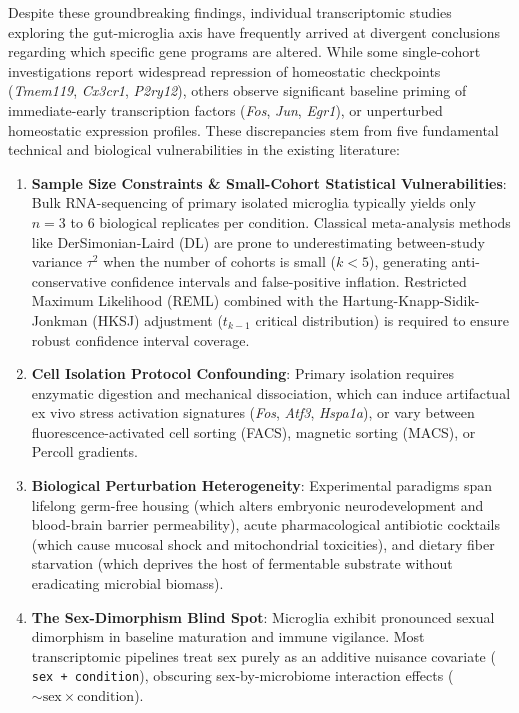 \documentclass[10pt,a4paper]{article}
\begin{document}
Despite these groundbreaking findings, individual transcriptomic studies exploring the gut-microglia axis have frequently arrived at divergent conclusions regarding which specific gene programs are altered\cite{sharon2016_11,abdelhaq2019_12}. While some single-cohort investigations report widespread repression of homeostatic checkpoints (\textit{Tmem119}, \textit{Cx3cr1}, \textit{P2ry12})\cite{thion2018_13}, others observe significant baseline priming of immediate-early transcription factors (\textit{Fos}, \textit{Jun}, \textit{Egr1}), or unperturbed homeostatic expression profiles\cite{spichak2021_14,honda2016_15}. These discrepancies stem from five fundamental technical and biological vulnerabilities in the existing literature:
\begin{enumerate}
\item \textbf{Sample Size Constraints \& Small-Cohort Statistical Vulnerabilities}: Bulk RNA-sequencing of primary isolated microglia typically yields only $n=3$ to $6$ biological replicates per condition. Classical meta-analysis methods like DerSimonian-Laird (DL) are prone to underestimating between-study variance $\tau^2$ when the number of cohorts is small ($k < 5$), generating anti-conservative confidence intervals and false-positive inflation. Restricted Maximum Likelihood (REML) combined with the Hartung-Knapp-Sidik-Jonkman (HKSJ) adjustment ($t_{k-1}$ critical distribution) is required to ensure robust confidence interval coverage.
\item \textbf{Cell Isolation Protocol Confounding}: Primary isolation requires enzymatic digestion and mechanical dissociation, which can induce artifactual ex vivo stress activation signatures (\textit{Fos}, \textit{Atf3}, \textit{Hspa1a})\cite{van2017_16,marsh2022_17}, or vary between fluorescence-activated cell sorting (FACS), magnetic sorting (MACS), or Percoll gradients\cite{bttcher2019_18}.
\item \textbf{Biological Perturbation Heterogeneity}: Experimental paradigms span lifelong germ-free housing (which alters embryonic neurodevelopment and blood-brain barrier permeability)\cite{braniste2014_19}, acute pharmacological antibiotic cocktails (which cause mucosal shock and mitochondrial toxicities)\cite{kennedy2020_20}, and dietary fiber starvation (which deprives the host of fermentable substrate without eradicating microbial biomass)\cite{matt2023_21}.
\item \textbf{The Sex-Dimorphism Blind Spot}: Microglia exhibit pronounced sexual dimorphism in baseline maturation and immune vigilance\cite{thion2018_13}. Most transcriptomic pipelines treat sex purely as an additive nuisance covariate (\texttt{\small ~ sex + condition}), obscuring sex-by-microbiome interaction effects ($\sim \text{sex} \times \text{condition}$).

\end{enumerate}
\end{document}
